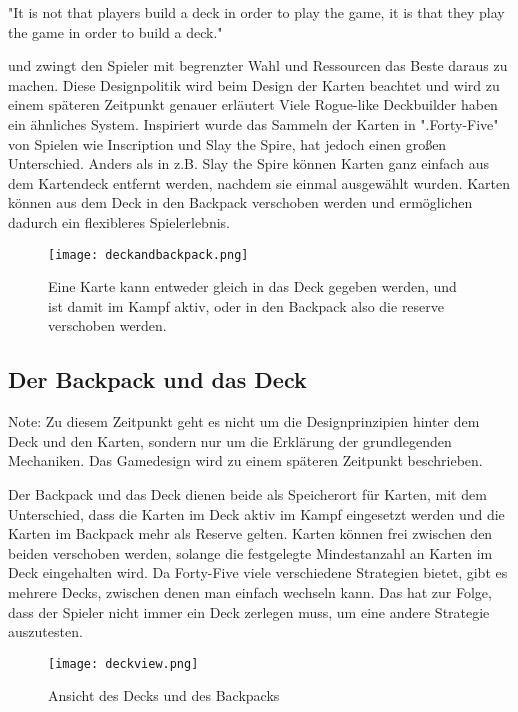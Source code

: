 "It is not that players build a deck in order to play the game, it is that they play the game in order to build a deck."\cite{zitatdeckbuilding}

und zwingt den Spieler mit begrenzter Wahl und Ressourcen das Beste daraus zu machen. Diese Designpolitik wird beim Design der Karten beachtet und wird zu einem späteren Zeitpunkt genauer erläutert %
Viele Rogue-like Deckbuilder haben ein ähnliches System. Inspiriert wurde das Sammeln der Karten in ".Forty-Five" von Spielen wie Inscription und Slay the Spire,
hat jedoch einen großen Unterschied. Anders als in z.B. Slay the Spire können Karten ganz einfach aus dem Kartendeck entfernt werden, nachdem sie einmal ausgewählt wurden.
Karten können aus dem Deck in den Backpack verschoben werden und ermöglichen dadurch ein flexibleres Spielerlebnis.\cite{slaythespire, inscryption, zitatdeckbuilding}


\begin{figure}[H]
    \texttt{[image: deckandbackpack.png]}
    \caption{Eine Karte kann entweder gleich in das Deck gegeben werden, und ist damit im Kampf aktiv, oder in den Backpack also die reserve verschoben werden.}
\end{figure}

\subsection{Der Backpack und das Deck}\label{backpack_and_deck}
\begin{infoBox}
Note: Zu diesem Zeitpunkt geht es nicht um die Designprinzipien hinter dem Deck und den Karten,
sondern nur um die Erklärung der grundlegenden Mechaniken. Das Gamedesign wird zu einem späteren Zeitpunkt beschrieben.
\end{infoBox}
Der Backpack und das Deck dienen beide als Speicherort für Karten, mit dem Unterschied, dass die Karten im Deck aktiv im
Kampf eingesetzt werden und die Karten im Backpack mehr als Reserve gelten.
Karten können frei zwischen den beiden verschoben werden, solange die festgelegte Mindestanzahl an Karten im Deck eingehalten wird.
Da Forty-Five viele verschiedene Strategien bietet, gibt es mehrere Decks, zwischen denen man einfach wechseln kann.
Das hat zur Folge, dass der Spieler nicht immer ein Deck zerlegen muss, um eine andere Strategie auszutesten.

\begin{figure}[H]
    \texttt{[image: deckview.png]}
    \caption{Ansicht des Decks und des Backpacks}
\end{figure}


